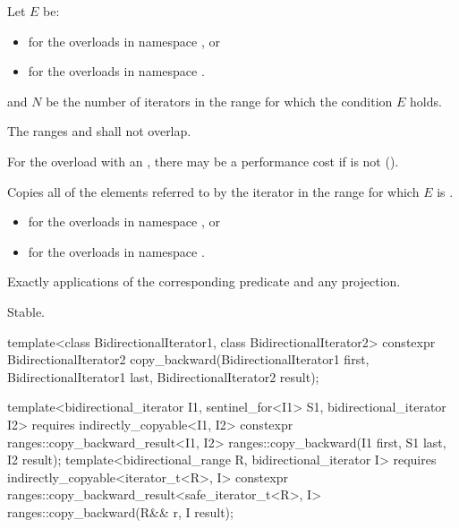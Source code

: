 \begin{itemdescr}
\pnum
Let $E$ be:
\begin{itemize}
\item
  for the overloads in namespace , or
\item
  for the overloads in namespace .
\end{itemize}
and $N$ be the number of iterators  in the range 
for which the condition $E$ holds.

\pnum
\requires
The ranges  and 
shall not overlap.
\begin{note}
For the overload with an ,
there may be a performance cost
if 
is not  ().
\end{note}

\pnum
\effects
Copies all of the elements referred to
by the iterator  in the range 
for which $E$ is .

\pnum
\returns
\begin{itemize}
\item
  for the overloads in namespace , or
\item
  for the overloads in namespace .
\end{itemize}

\pnum
\complexity
Exactly  applications
of the corresponding predicate and any projection.

\pnum
\remarks
Stable.
\end{itemdescr}

%
\begin{itemdecl}
template<class BidirectionalIterator1, class BidirectionalIterator2>
  constexpr BidirectionalIterator2
    copy_backward(BidirectionalIterator1 first,
                  BidirectionalIterator1 last,
                  BidirectionalIterator2 result);

template<bidirectional_iterator I1, sentinel_for<I1> S1, bidirectional_iterator I2>
  requires indirectly_copyable<I1, I2>
  constexpr ranges::copy_backward_result<I1, I2>
    ranges::copy_backward(I1 first, S1 last, I2 result);
template<bidirectional_range R, bidirectional_iterator I>
  requires indirectly_copyable<iterator_t<R>, I>
  constexpr ranges::copy_backward_result<safe_iterator_t<R>, I>
    ranges::copy_backward(R&& r, I result);
\end{itemdecl}

